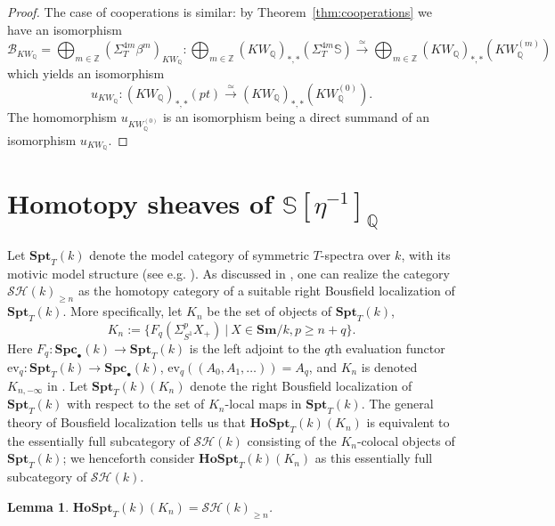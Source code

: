 \documentclass[a4paper,12pt,draft]{amsart}
\newtheorem{lemma}{Lemma}
\theoremstyle{definition}
\theoremstyle{remark}
\begin{document}
\begin{proof}
The case of cooperations is similar: by Theorem~\ref{thm:cooperations} we have an isomorphism
\[
\mathcal{B}_{KW_{{\mathbb Q}}}= \bigoplus_{m\in {{\mathbb Z}}}  (\Sigma^{4m}_T\beta^m)_{KW_{{\mathbb Q}}}  \colon \bigoplus_{m\in {{\mathbb Z}}} (KW_{{\mathbb Q}})_{*,*}( \Sigma^{4m}_T \mathbb{S}) \xrightarrow{\simeq} \bigoplus_{m\in {{\mathbb Z}}} (KW_{{\mathbb Q}})_{*,*}( KW^{(m)}_{{\mathbb Q}})
\]
which yields an isomorphism
\[
u_{KW_{{\mathbb Q}}}\colon (KW_{{\mathbb Q}})_{*,*}(pt) \xrightarrow{\simeq} (KW_{{\mathbb Q}})_{*,*}(KW^{(0)}_{{\mathbb Q}}).
\]
The homomorphism $u_{KW_{{\mathbb Q}}^{(0)}}$ is an isomorphism being a direct summand of an isomorphism $u_{KW_{{\mathbb Q}}}$.
\end{proof}

\section{Homotopy sheaves of $\mathbb{S}[\eta^{-1}]_{{\mathbb Q}}$}

Let  ${{\mathbf{Spt}}}_T(k)$ denote the model category of symmetric $T$-spectra over $k$, with its motivic model structure (see e.g. \cite{Jardine00}). As discussed in \cite[\S3]{Lev13b}, one can realize the category  $ {\mathcal{SH}}(k)_{\ge n}$ as the homotopy category of a suitable right Bousfield localization of  ${{\mathbf{Spt}}}_T(k)$. More specifically, let $K_n$ be the set of objects of ${{\mathbf{Spt}}}_T(k)$,
\[
K_n:=\{F_q(\Sigma^p_{S^1}X_+)\ |\ X\in {{\mathbf{Sm}}}/k, p\ge n+q \}.
\]
Here $F_q:{{\mathbf{Spc}}}_\bullet(k)\to {{\mathbf{Spt}}}_T(k)$ is the left adjoint to the $q$th evaluation functor ${\text{ev}}_q:{{\mathbf{Spt}}}_T(k)\to {{\mathbf{Spc}}}_\bullet(k)$, ${\text{ev}}_q((A_0, A_1,\ldots))=A_q$, and $K_n$ is denoted $K_{n,-\infty}$ in \cite[\hbox{\it loc. cit.}]{Lev13b}. Let ${{\mathbf{Spt}}}_T(k)(K_n)$ denote the right Bousfield localization of ${{\mathbf{Spt}}}_T(k)$ with respect to the set of $K_n$-local maps in ${{\mathbf{Spt}}}_T(k)$. The general theory of Bousfield localization tells us that ${{\mathbf{Ho}}}{{\mathbf{Spt}}}_T(k)(K_n)$ is equivalent to the essentially  full subcategory of ${\mathcal{SH}}(k)$ consisting of the  $K_n$-colocal objects of ${{\mathbf{Spt}}}_T(k)$; we henceforth consider  ${{\mathbf{Ho}}}{{\mathbf{Spt}}}_T(k)(K_n)$ as this essentially full subcategory of ${\mathcal{SH}}(k)$.

\begin{lemma} \label{lem:Bousfield} ${{\mathbf{Ho}}}{{\mathbf{Spt}}}_T(k)(K_n)={\mathcal{SH}}(k)_{\ge n}$.
\end{lemma}
\end{document}
